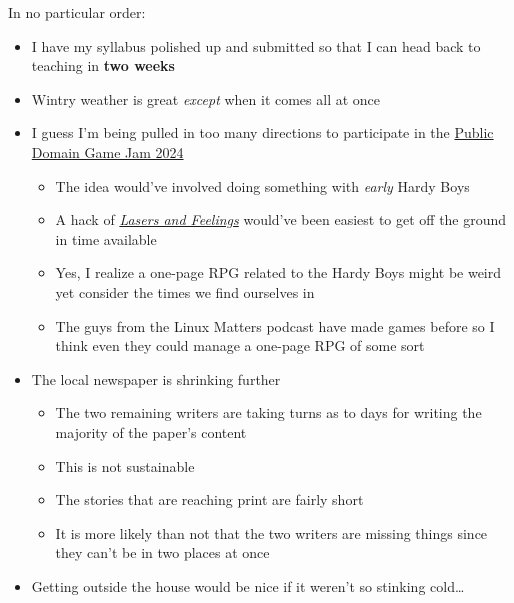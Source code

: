 In no particular order:

\begin{itemize}
\tightlist
\item
  I have my syllabus polished up and submitted so that I can head back
  to teaching in \textbf{two weeks}
\item
  Wintry weather is great \emph{except} when it comes all at once
\item
  I guess I'm being pulled in too many directions to participate in the
  \href{https://www.techdirt.com/2024/01/01/and-were-off-time-to-get-started-on-this-years-public-domain-game-jam/}{Public
  Domain Game Jam 2024}

  \begin{itemize}
  \tightlist
  \item
    The idea would've involved doing something with \emph{early} Hardy
    Boys
  \item
    A hack of
    \href{https://johnharper.itch.io/lasers-feelings}{\emph{Lasers and
    Feelings}} would've been easiest to get off the ground in time
    available
  \item
    Yes, I realize a one-page RPG related to the Hardy Boys might be
    weird yet consider the times we find ourselves in
  \item
    The guys from the Linux Matters podcast have made games before so I
    think even they could manage a one-page RPG of some sort
  \end{itemize}
\item
  The local newspaper is shrinking further

  \begin{itemize}
  \tightlist
  \item
    The two remaining writers are taking turns as to days for writing
    the majority of the paper's content
  \item
    This is not sustainable
  \item
    The stories that are reaching print are fairly short
  \item
    It is more likely than not that the two writers are missing things
    since they can't be in two places at once
  \end{itemize}
\item
  Getting outside the house would be nice if it weren't so stinking
  cold\ldots{}
\end{itemize}
